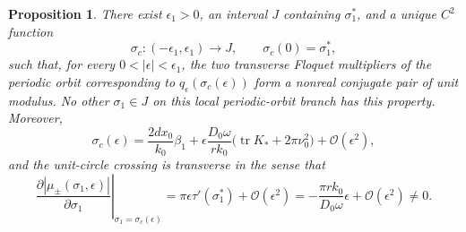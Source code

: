 \documentclass[11pt]{amsart}
\newtheorem{proposition}[theorem]{Proposition}
\theoremstyle{remark}
\newcommand{\tr}{\operatorname{tr}}
\newcommand{\cO}{\mathcal{O}}
\begin{document}
\begin{proposition}
\label{prop:unit-modulus}
There exist $\epsilon_1>0$, an interval $J$ containing $\sigma_1^*$,
and a unique $C^2$ function
\[
\sigma_c:(-\epsilon_1,\epsilon_1)\to J,
\qquad
\sigma_c(0)=\sigma_1^*,
\]
such that, for every $0<|\epsilon|<\epsilon_1$, the two transverse
Floquet multipliers of the periodic orbit corresponding to
$q_\epsilon(\sigma_c(\epsilon))$ form a nonreal conjugate pair of unit
modulus. No other $\sigma_1\in J$ on this local periodic-orbit branch has
this property. Moreover,
\begin{equation}
\label{eq:sigma-c-expansion}
\sigma_c(\epsilon)
=
\frac{2dx_0}{k_0}\beta_1
+
\epsilon\frac{D_0\omega}{rk_0}
\bigl(\tr K_*+2\pi\nu_0^2\bigr)
+
\cO(\epsilon^2),
\end{equation}
and the unit-circle crossing is transverse in the sense that
\begin{equation}
\label{eq:multiplier-crossing}
\left.
\frac{\partial|\mu_\pm(\sigma_1,\epsilon)|}
{\partial\sigma_1}
\right|_{\sigma_1=\sigma_c(\epsilon)}
=
\pi\epsilon\tau'(\sigma_1^*)
+\cO(\epsilon^2)
=
-\frac{\pi r k_0}{D_0\omega}\epsilon
+\cO(\epsilon^2)
\ne0.
\end{equation}
\end{proposition}
\end{document}
